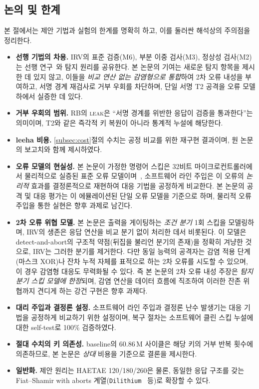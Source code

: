 \subsection{논의 및 한계}
\label{sec:disc}

본 절에서는 제안 기법과 실험의 한계를 명확히 하고, 이를 둘러싼 해석상의 주의점을 정리한다.

\begin{itemize}
  \item \textbf{선행 기법의 차용.} IRV의 표준 검증(M6), 부분 이중 검사(M3), 정상성 검사(M2)는
        선행 연구~\cite{lee2026haetae}와 탐지 원리를 공유한다. 본 논문의 기여는 새로운 탐지 항목을
        제시한 데 있지 않고, 이들을 \emph{비교 연산 없는 감염형으로 통합}하여 2차 오류 내성을 부여하고,
        서명 경계 재검사로 거부 우회를 차단하며, 단일 서명 T2 공격을 오류 모델 하에서 실증한 데 있다.
  \item \textbf{거부 우회의 범위.} RB의 \textsc{leak}은 ``서명 경계를 위반한 응답이 검증을
        통과한다''는 의미이며, T2와 같은 즉각적 키 복원이 아니라 통계적 누설에 해당한다.
  \item \textbf{\textsf{leeha} 비용.} \ref{subsec:cost}절의 수치는 공정 비교를 위한 재구현 결과이며,
        원 논문의 보고치와 함께 제시하였다.
  \item \textbf{오류 모델의 현실성.} 본 논문이 가정한 명령어 스킵은 32비트 마이크로컨트롤러에서
        물리적으로 실증된 표준 오류 모델이며~\cite{moro2013}, 소프트웨어 라인 주입은 이 오류의
        \emph{논리적} 효과를 결정론적으로 재현하여 대응 기법을 공정하게 비교한다. 본 논문의 공격 및
        대응 평가는 이 에뮬레이션된 단일 오류 모델을 기준으로 하며, 물리적 오류 주입을 통한 실현은
        향후 과제로 남긴다.
  \item \textbf{2차 오류 위협 모델.} 본 논문은 출력을 게이팅하는 \emph{조건 분기} 1회 스킵을
        모델링하며, IRV의 생존은 응답 연산을 비교 분기 없이 처리한 데서 비롯된다. 이 모델은
        detect-and-abort의 구조적 약점(뒤집을 불리언 분기의 존재)을 정확히 겨냥한 것으로, IRV는
        그러한 분기를 제거한다. 다만 동일 능력의 공격자는 감염 적용 단계(마스크 XOR)나 잔차 누적
        자체를 표적으로 하는 2차 오류를 시도할 수 있으며, 이 경우 감염형 대응도 무력화될 수 있다.
        즉 본 논문의 2차 오류 내성 주장은 \emph{탐지 분기 스킵 모델에 한정}되며, 감염 연산을
        데이터 흐름에 직조하여 이러한 잔존 위협까지 견디게 하는 강건 구현은 향후 과제다.
  \item \textbf{대리 주입과 결정론 설정.} 소프트웨어 라인 주입과 결정론 난수 발생기는 대응 기법을
        공정하게 비교하기 위한 설정이며, 복구 절차는 소프트웨어 클린 스킵 누설에 대한 self-test로 100\% 검증하였다.
  \item \textbf{절대 수치의 키 의존성.} \textsf{baseline}의 60.86\,M 사이클은 해당 키의 거부 반복
        횟수에 의존하므로, 본 논문은 \emph{상대} 비용을 기준으로 결론을 제시한다.
  \item \textbf{일반화.} 제안 원리는 HAETAE 120/180/260은 물론, 동일한 응답 구조를 갖는 Fiat--Shamir
        with aborts 계열(\texttt{Dilithium}~\cite{dilithium} 등)로 확장할 수 있다.
\end{itemize}
